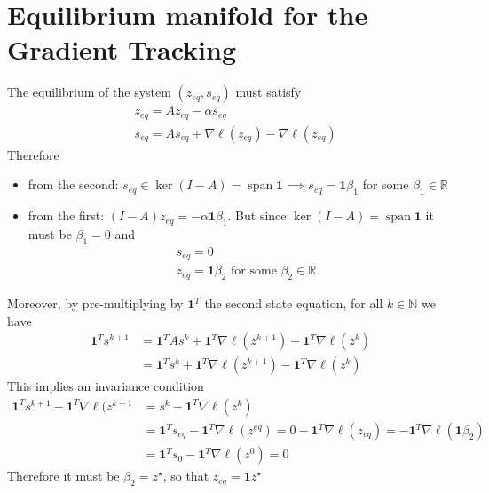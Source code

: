 \documentclass{book}
\DeclareMathOperator{\vspan}{span}
\newcommand{\R}{\mathbb{R}}
\newcommand{\N}{\mathbb{N}}
\theoremstyle{theoremv2}
\theoremstyle{defv2}
\theoremstyle{remark}
\theoremstyle{remark}
\theoremstyle{definition}
\theoremstyle{definition}
\begin{document}
\section{Equilibrium manifold for the Gradient Tracking}
The equilibrium of the system $(z_{eq},s_{eq})$ must satisfy
\begin{align*}
    & z_{eq} = A z_{eq}-\alpha s_{eq} \\
    & s_{eq} = A s_{eq} + \nabla\boldsymbol{\ell}(z_{eq}) - \nabla\boldsymbol{\ell}(z_{eq})
\end{align*}
Therefore 
\begin{itemize}
    \item from the second: $s_{eq}\in\ker(I-A)=\vspan \boldsymbol{1} \implies s_{eq} =\boldsymbol{1}\beta_1$ for some $\beta_1\in\R$
    \item from the first: $(I-A)z_{eq} = -\alpha\boldsymbol{1}\beta_1$. But since $\ker(I-A)=\vspan \boldsymbol{1}$ it must be $\beta_1=0$ and  
        \begin{align*}
            &s_{eq} = 0 \\
            &z_{eq} = \boldsymbol{1} \beta_2 \text{ for some } \beta_2 \in\R
        \end{align*}
\end{itemize}
Moreover, by pre-multiplying by $\boldsymbol{1}^T$ the second state equation, for all $k\in\N$ we have
\begin{align*}
    \boldsymbol{1}^T s^{k+1} &= \boldsymbol{1}^T A s^{k} +\boldsymbol{1}^T \nabla\boldsymbol{\ell}(z^{k+1} ) -\boldsymbol{1}^T \nabla\boldsymbol{\ell}(z^{k})\\ 
    &= \boldsymbol{1}^T s^k+\boldsymbol{1}^T \nabla\boldsymbol{\ell}(z^{k+1}) -\boldsymbol{1}^T \nabla\boldsymbol{\ell}(z^{k}) 
\end{align*}
This implies an invariance condition 
\begin{align*}
    \boldsymbol{1}^T s^{k+1} -\boldsymbol{1}^T \nabla\boldsymbol{\ell}(z^{k+1} &=  s^{k}  -\boldsymbol{1}^T \nabla\boldsymbol{\ell}(z^{k})\\ 
    &= \boldsymbol{1}^Ts_{eq}-\boldsymbol{1}^T \nabla\boldsymbol{\ell}(z^{eq}) = 0 - \boldsymbol{1}^T\nabla\boldsymbol{\ell}(z_{eq}) = -\boldsymbol{1}^T\nabla\boldsymbol{\ell}(\boldsymbol{1}\beta_2)\\ 
    &= \boldsymbol{1}^Ts_{0}-\boldsymbol{1}^T \nabla\boldsymbol{\ell}(z^{0}) = 0
\end{align*}
Therefore it must be $\beta_2=z^\star$, so that $z_{eq} =\boldsymbol{1}z^\star$
\end{document}
